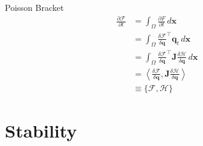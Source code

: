 \documentclass{beamer}
\begin{document}
		\begin{frame}[t]{Poisson Bracket}
			\begin{align*}
					\frac{\partial \mathcal{F}}{\partial t}
					&= \int_\Omega \frac{\partial F}{\partial t} \, d\mathbf{x} \\
					&= \int_\Omega \frac{\delta \mathcal{F}}{\delta \mathbf{q}}^\top \mathbf{q}_t\, d\mathbf{x} \\
					&= \int_\Omega \frac{\delta \mathcal{F}}{\delta \mathbf{q}}^\top \mathbf{J}\frac{\delta \mathcal{H}}{\delta \mathbf{q}}\, d\mathbf{x} \\
					&= \left< \frac{\delta \mathcal{F}}{\delta \mathbf{q}}, \mathbf{J}\frac{\delta \mathcal{H}}{\delta \mathbf{q}} \right> \\
					&\equiv \{\mathcal{F}, \mathcal{H}\}
				\end{align*}
		\end{frame}

	\section{Stability}
\end{document}
